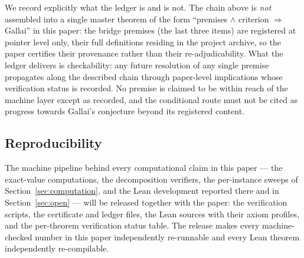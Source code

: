 We record explicitly what the ledger is and is not. The chain above is \emph{not} assembled
into a single master theorem of the form ``premises $\wedge$ criterion $\Rightarrow$ Gallai''
in this paper: the bridge premises (the last three items) are registered at pointer level
only, their full definitions residing in the project archive, so the paper certifies their
provenance rather than their re-adjudicability. What the ledger delivers is checkability:
any future resolution of any single premise propagates along the described chain through
paper-level implications whose verification status is recorded. No premise is claimed to be
within reach of the machine layer except as recorded, and the conditional route must not be
cited as progress towards Gallai's conjecture beyond its registered content.

\subsection{Reproducibility}\label{int:subsec-repro}

The machine pipeline behind every computational claim in this paper --- the exact-value
computations, the decomposition verifiers, the per-instance sweeps of
Section~\ref{sec:computation}, and the Lean development reported there and in
Section~\ref{sec:open} --- will be released together with the paper: the verification scripts, the certificate and
ledger files, the Lean sources with their axiom profiles, and the per-theorem verification
status table. The release makes every machine-checked number in this paper independently
re-runnable and every Lean theorem independently re-compilable.

